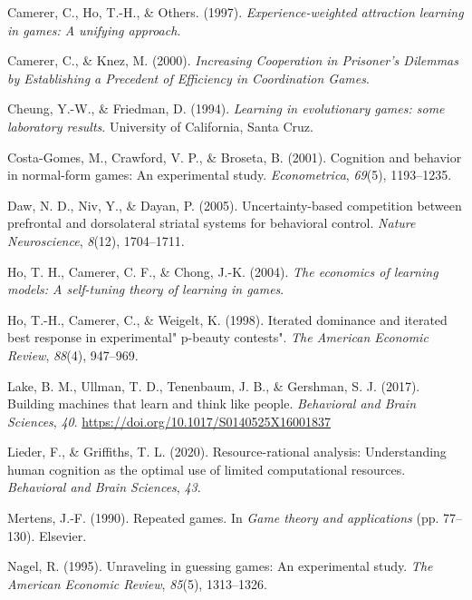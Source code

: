 \documentclass[man,floatsintext]{apa6}
\begin{document}
\leavevmode\hypertarget{ref-camerer1997experience}{}%
Camerer, C., Ho, T.-H., \& Others. (1997). \emph{Experience-weighted attraction learning in games: A unifying approach}.

\leavevmode\hypertarget{ref-knez2000}{}%
Camerer, C., \& Knez, M. (2000). \emph{Increasing Cooperation in Prisoner's Dilemmas by Establishing a Precedent of Efficiency in Coordination Games}.

\leavevmode\hypertarget{ref-cheung1994learning}{}%
Cheung, Y.-W., \& Friedman, D. (1994). \emph{Learning in evolutionary games: some laboratory results}. University of California, Santa Cruz.

\leavevmode\hypertarget{ref-costa2001cognition}{}%
Costa-Gomes, M., Crawford, V. P., \& Broseta, B. (2001). Cognition and behavior in normal-form games: An experimental study. \emph{Econometrica}, \emph{69}(5), 1193--1235.

\leavevmode\hypertarget{ref-daw2005uncertainty}{}%
Daw, N. D., Niv, Y., \& Dayan, P. (2005). Uncertainty-based competition between prefrontal and dorsolateral striatal systems for behavioral control. \emph{Nature Neuroscience}, \emph{8}(12), 1704--1711.

\leavevmode\hypertarget{ref-ho2004economics}{}%
Ho, T. H., Camerer, C. F., \& Chong, J.-K. (2004). \emph{The economics of learning models: A self-tuning theory of learning in games}.

\leavevmode\hypertarget{ref-ho1998iterated}{}%
Ho, T.-H., Camerer, C., \& Weigelt, K. (1998). Iterated dominance and iterated best response in experimental" p-beauty contests". \emph{The American Economic Review}, \emph{88}(4), 947--969.

\leavevmode\hypertarget{ref-Lake2017}{}%
Lake, B. M., Ullman, T. D., Tenenbaum, J. B., \& Gershman, S. J. (2017). Building machines that learn and think like people. \emph{Behavioral and Brain Sciences}, \emph{40}. \url{https://doi.org/10.1017/S0140525X16001837}

\leavevmode\hypertarget{ref-lieder2020resource}{}%
Lieder, F., \& Griffiths, T. L. (2020). Resource-rational analysis: Understanding human cognition as the optimal use of limited computational resources. \emph{Behavioral and Brain Sciences}, \emph{43}.

\leavevmode\hypertarget{ref-mertens1990repeated}{}%
Mertens, J.-F. (1990). Repeated games. In \emph{Game theory and applications} (pp. 77--130). Elsevier.

\leavevmode\hypertarget{ref-nagel1995unraveling}{}%
Nagel, R. (1995). Unraveling in guessing games: An experimental study. \emph{The American Economic Review}, \emph{85}(5), 1313--1326.
\end{document}
